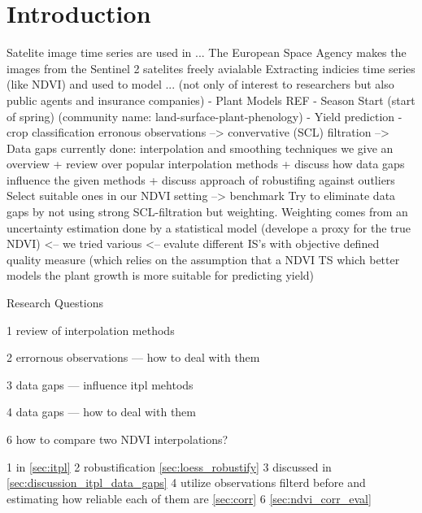 \chapter{Introduction}


Satelite image time series are used in ...
    The European Space Agency makes the images from the Sentinel 2 satelites freely avialable
        Extracting indicies time series (like NDVI) and used to model ... (not only of interest to researchers but also public agents and insurance companies)
                        - Plant Models REF
                        - Season Start (start of spring) (community name: land-surface-plant-phenology)
                        - Yield prediction
                        - crop classification
            erronous observations --> convervative (SCL) filtration 
                --> Data gaps
                    currently done: interpolation and smoothing techniques
                    we give an overview + review over popular interpolation methods + discuss how data gaps influence the given methods + discuss approach of robustifing against outliers
                    Select suitable ones in our NDVI setting --> benchmark
                Try to eliminate data gaps by not using strong SCL-filtration but weighting. Weighting comes from an uncertainty estimation done by a statistical model (develope a proxy for the true NDVI) <-- we tried various <-- evalute different IS's with objective defined quality measure (which relies on the assumption that a NDVI TS which better models the plant growth is more suitable for predicting yield)
            


Research Questions
\begin{Nenumerate}
    \item 1 review of interpolation methods
    \item 2 errornous observations --- how to deal with them
    \item 3 data gaps --- influence itpl mehtods 
    \item 4 data gaps --- how to deal with them
    \item 6 how to compare two NDVI interpolations?
\end{Nenumerate}
1 in \ref{sec:itpl}
2 robustification \ref{sec:loess_robustify}
3 discussed in \ref{sec:discussion_itpl_data_gaps}
4 utilize observations filterd before and estimating how reliable each of them are \ref{sec:corr}
6 \ref{sec:ndvi_corr_eval}

